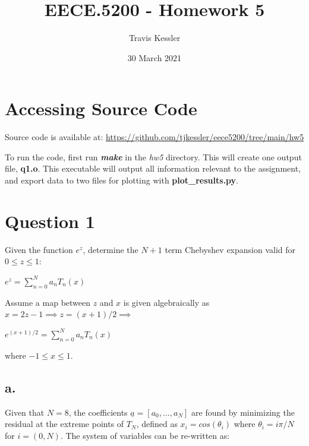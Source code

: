 \documentclass{report}
\title{EECE.5200 - Homework 5}
\author{Travis Kessler}
\date{30 March 2021}
\begin{document}
	\maketitle
	\newpage

	\lstset{frame=lines}

	\section*{Accessing Source Code}
	
	Source code is available at: \href{https://github.com/tjkessler/eece5200/tree/main/hw5}{https://github.com/tjkessler/eece5200/tree/main/hw5}
	
	\textit{}
	
	\noindent To run the code, first run \textbf{\textit{make}} in the \textit{hw5} directory. This will create one output file, \textbf{q1.o}. This executable will output all information relevant to the assignment, and export data to two files for plotting with \textbf{plot\_results.py}.

	\section*{Question 1}
	
	Given the function $e^z$, determine the $N + 1$ term Chebyshev expansion valid for $0 \leq z \leq 1$:
	
	\begin{center}
		
		$e^z = \sum_{n=0}^{N}a_n T_n (x)$

	\end{center}

	\noindent Assume a map between $z$ and $x$ is given algebraically as $x = 2z - 1 \implies z = (x + 1) / 2 \implies$
	
	\begin{center}
		$e^{(x+1) / 2} = \sum_{n=0}^{N}a_n T_n (x)$
	\end{center}

	\noindent where $-1 \leq x \leq 1$.
	
	\subsection*{a.}
	
	Given that $N = 8$, the coefficients $\underline{a} = [a_0, ..., a_N]$ are found by minimizing the residual at the extreme points of $T_N$, defined as $x_i = cos(\theta_i)$ where $\theta_i = i \pi / N$ for $i = (0, N)$. The system of variables can be re-written as:
	
\end{document}
